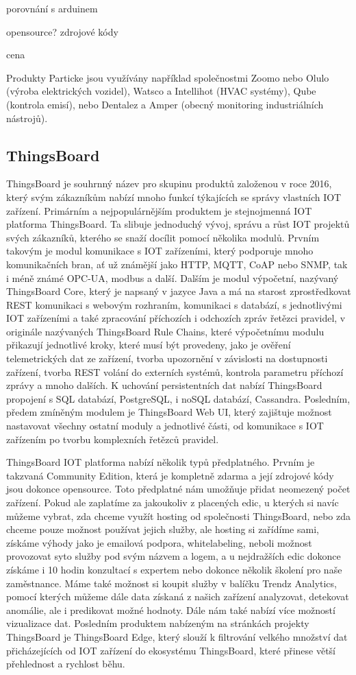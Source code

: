 porovnání s arduinem

opensource? zdrojové kódy

cena

Produkty Particke jsou využívány například společnostmi Zoomo nebo Olulo (výroba elektrických vozidel), Watsco a Intellihot (HVAC systémy), Qube (kontrola emisí), nebo Dentalez a Amper (obecný monitoring industriálních nástrojů).

\subsection{ThingsBoard}

ThingsBoard je souhrnný název pro skupinu produktů založenou v roce 2016, který svým zákazníkům nabízí mnoho funkcí týkajících se správy vlastních IOT zařízení. Primárním a nejpopulárnějším produktem je stejnojmenná IOT platforma ThingsBoard. Ta slibuje jednoduchý vývoj, správu a růst IOT projektů svých zákazníků, kterého se snaží docílit pomocí několika modulů. Prvním takovým je modul komunikace s IOT zařízeními, který podporuje mnoho komunikačních bran, ať už známější jako HTTP, MQTT, CoAP nebo SNMP, tak i méně známé OPC-UA, modbus a další. Dalším je modul výpočetní, nazývaný ThingsBoard Core, který je napsaný v jazyce Java a má na starost zprostředkovat REST komunikaci s webovým rozhraním, komunikaci s databází, s jednotlivými IOT zařízeními a také zpracování příchozích i odchozích zpráv řetězci pravidel, v originále nazývaných ThingsBoard Rule Chains, které výpočetnímu modulu přikazují jednotlivé kroky, které musí být provedeny, jako je ověření telemetrických dat ze zařízení, tvorba upozornění v závislosti na dostupnosti zařízení, tvorba REST volání do externích systémů, kontrola parametru příchozí zprávy a mnoho dalších. K uchování persistentních dat nabízí ThingsBoard propojení s SQL databází, PostgreSQL, i noSQL databází, Cassandra. Posledním, předem zmíněným modulem je ThingsBoard Web UI, který zajištuje možnost nastavovat všechny ostatní moduly a jednotlivé části, od komunikace s IOT zařízením po tvorbu komplexních řetězců pravidel.

ThingsBoard IOT platforma nabízí několik typů předplatného. Prvním je takzvaná Community Edition, která je kompletně zdarma a její zdrojové kódy jsou dokonce opensource. Toto předplatné nám umožňuje přidat neomezený počet zařízení. Pokud ale zaplatíme za jakoukoliv z placených edic, u kterých si navíc můžeme vybrat, zda chceme využít hosting od společnosti ThingsBoard, nebo zda chceme pouze možnost používat jejich služby, ale hosting si zařídíme sami, získáme výhody jako je emailová podpora, whitelabeling, neboli možnost provozovat syto služby pod svým názvem a logem, a u nejdražších edic dokonce získáme i 10 hodin konzultací s expertem nebo dokonce několik školení pro naše zaměstnance. Máme také možnost si koupit služby v balíčku Trendz Analytics, pomocí kterých můžeme dále data získaná z našich zařízení analyzovat, detekovat anomálie, ale i predikovat možné hodnoty. Dále nám také nabízí více možností vizualizace dat. Posledním produktem nabízeným na stránkách projekty ThingsBoard je ThingsBoard Edge, který slouží k filtrování velkého množství dat přicházejících od IOT zařízení do ekosystému ThingsBoard, které přinese větší přehlednost a rychlost běhu.

